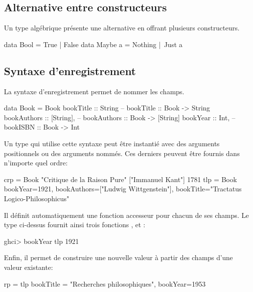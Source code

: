 \subsection{Alternative entre constructeurs}
\label{algebraic-types}

Un type algébrique présente une alternative en offrant plusieurs constructeurs.

\begin{haskellcode}
data Bool = True | False
data Maybe a = Nothing | Just a
\end{haskellcode}

\subsection{Syntaxe d'enregistrement}

La syntaxe d'enregistrement permet de nommer les champs.

\begin{haskellcode}
data Book = Book {
    bookTitle :: String      -- bookTitle :: Book -> String
    bookAuthors :: [String], -- bookAuthors :: Book -> [String]
    bookYear :: Int,         -- bookISBN :: Book -> Int
    }
\end{haskellcode}

Un type qui utilise cette syntaxe peut être instantié avec des arguments positionnels ou des arguments nommés. Ces derniers peuvent être fournis dans n'importe quel ordre:

\begin{haskellcode}
crp = Book "Critique de la Raison Pure" ["Immanuel Kant"] 1781
tlp = Book {
             bookYear=1921,
             bookAuthors=["Ludwig Wittgenstein"],
             bookTitle="Tractatus Logico-Philosophicus"
           }
\end{haskellcode}

Il définit automatiquement une fonction accesseur pour chacun de ses champs. Le type  ci-dessus fournit ainsi trois fonctions ,  et :

\begin{haskellcode}
ghci> bookYear tlp
1921
\end{haskellcode}

Enfin, il permet de construire une nouvelle valeur à partir des champs d'une valeur existante:

\begin{haskellcode}
rp = tlp {bookTitle = "Recherches philosophiques", bookYear=1953}
\end{haskellcode}

